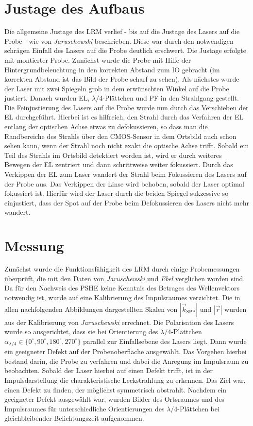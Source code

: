 \documentclass[a4paper, titlepage,  ngerman]{book}
\begin{document}
	\section{Justage des Aufbaus}
	Die allgemeine Justage des LRM verlief - bis auf die Justage des Lasers auf die Probe - wie von \textit{Jaruschewski} \cite{Jaruschewski.2020} beschrieben. Diese war durch den notwendigen schrägen Einfall des Lasers auf die Probe deutlich erschwert. Die Justage erfolgte mit montierter Probe. Zunächst wurde die Probe mit Hilfe der Hintergrundbeleuchtung in den korrekten Abstand zum IO gebracht (im korrekten Abstand ist das Bild der Probe scharf zu sehen). Als nächstes wurde der Laser mit zwei Spiegeln grob in dem erwünschten Winkel auf die Probe justiert. Danach wurden EL, $\lambda/4$-Plättchen und PF in den Strahlgang gestellt. Die Feinjustierung des Lasers auf die Probe wurde nun durch das Verschieben der EL durchgeführt. Hierbei ist es hilfreich, den Strahl durch das Verfahren der EL entlang der optischen Achse etwas zu defokussieren, so dass man die Randbereiche des Strahls über den CMOS-Sensor in dem Ortsbild auch schon sehen kann, wenn der Strahl noch nicht exakt die optische Achse trifft. Sobald ein Teil des Strahls im Ortsbild detektiert worden ist, wird er durch weiteres Bewegen der EL zentriert und dann schrittweise weiter fokussiert. Durch das Verkippen der EL zum Laser wandert der Strahl beim Fokussieren des Lasers auf der Probe aus. Das Verkippen der Linse wird behoben, sobald der Laser optimal fokussiert ist. Hierfür wird der Laser durch die beiden Spiegel sukzessive so einjustiert, dass der Spot auf der Probe beim Defokussieren des Lasers nicht mehr wandert.
	
		
	\section{Messung}
	Zunächst wurde die Funktionsfähigkeit des LRM durch einige Probemessungen überprüft, die mit den Daten von \textit{Jaruschewski} \cite{Jaruschewski.2020} und \textit{Ebel} \cite{ebel.2019} verglichen worden sind. Da für den Nachweis des PSHE keine Kenntnis des Betrages des Wellenvektors notwendig ist, wurde auf eine Kalibrierung des Impulsraumes verzichtet. Die in allen nachfolgenden Abbildungen dargestellten Skalen von $|\vec{k}_{\mathrm{SPP}}|$ und $|\vec{r}|$ wurden aus der Kalibrierung von \textit{Jaruschewski} errechnet. Die Polarisation des Lasers wurde so ausgerichtet, dass sie bei Orientierung des $\lambda/4$-Plättchen $\alpha_{\lambda/4} \in \{0^\circ, 90^\circ, 180^\circ, 270^\circ\}$ parallel zur Einfallsebene des Lasers liegt.  Dann wurde ein geeigneter Defekt auf der Probenoberfläche ausgewählt. Das Vorgehen hierbei bestand darin, die Probe zu verfahren und dabei die Anregung im Impulsraum zu beobachten. Sobald der Laser hierbei auf einen Defekt trifft, ist in der Impulsdarstellung die charakteristische Leckstrahlung zu erkennen. Das Ziel war, einen Defekt zu finden, der möglichst symmetrisch abstrahlt. Nachdem ein geeigneter Defekt ausgewählt war, wurden Bilder des Ortsraumes und des Impulsraumes für unterschiedliche Orientierungen des $\lambda/4$-Plättchen bei gleichbleibender Belichtungszeit aufgenommen.
\end{document}

